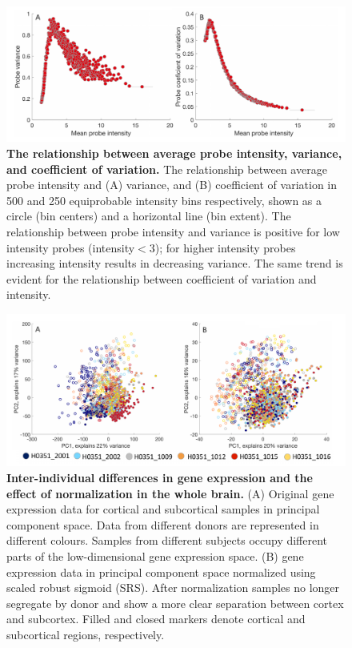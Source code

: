 \begin{figure}[h!]
  \centering
    \includegraphics[width=1\textwidth]{Chapter4/FigureS4.pdf}
\caption{\textbf{The relationship between average probe intensity, variance, and coefficient of variation.}
The relationship between average probe intensity and (A) variance, and (B) coefficient of variation in 500 and 250 equiprobable intensity bins respectively, shown as a circle (bin centers) and a horizontal line (bin extent). The relationship between probe intensity and variance is positive for low intensity probes (intensity$<3$); for higher intensity probes increasing intensity results in decreasing variance. The same trend is evident for the relationship between coefficient of variation and intensity.}
\label{fig:Ch4Sfig4}
\end{figure}

\begin{figure}[h!]
  \centering
    \includegraphics[width=1\textwidth]{Chapter4/FigureS5.pdf}
\caption{\textbf{Inter-individual differences in gene expression and the effect of normalization in the whole brain.}
(A) Original gene expression data for cortical and subcortical samples in principal component space. Data from different donors are represented in different colours. Samples from different subjects occupy different parts of the low-dimensional gene expression space. 
(B) gene expression data in principal component space normalized using scaled robust sigmoid (SRS). After normalization samples no longer segregate by donor and show a more clear separation between cortex and subcortex. Filled and closed markers denote cortical and subcortical regions, respectively.}
\label{fig:Ch4Sfig5}
\end{figure}

